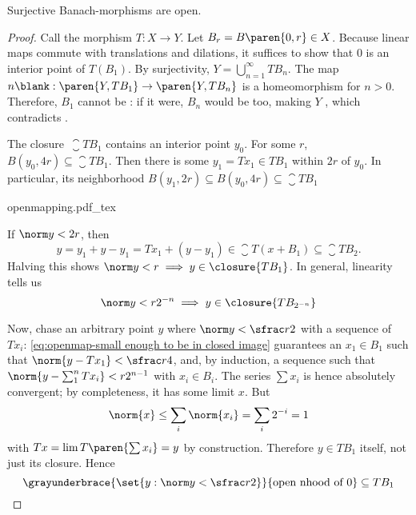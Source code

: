 \documentclass{scrartcl}
\newcommand{\ball}{B}
\begin{document}
\begin{theorem}
  Surjective Banach-morphisms are open.
\end{theorem}
\begin{proof}
  Call the morphism \(T:X\to Y\). Let \(\ball_r=\ball\paren{0,r}\in X\). Because linear maps commute with translations and dilations, it suffices to show that \(0\) is an interior point of \(T(B_1)\). By surjectivity,
  \(Y = \bigcup_{n=1}^\infty TB_n\). The map \(n\blank: \paren{Y,TB_1}\to \paren{Y,TB_n}\) is a homeomorphism for \(n>0\). Therefore, \(B_1\) cannot be : if it were, \(\ball_n\) would be too, making \(Y\) , which contradicts .

  The closure~\(\closure{T\ball_1}\) contains an interior point \(y_0\). For some \(r\), \(\ball(y_0,4r)\subseteq \closure{T\ball_1}\). Then there is some \(y_1=Tx_1\in T\ball_1\) within \(2r\) of \(y_0\). In particular, its neighborhood \(\ball(y_1,2r)\subseteq \ball(y_0,4r)\subseteq \closure{T\ball_1}\)
  \begin{center}
    {openmapping.pdf_tex}
  \end{center}
  If \(\norm y < 2r\), then \[y=y_1+y-y_1 = Tx_1 + (y-y_1)\in \closure{T(x+\ball_1)}\subseteq \closure{T\ball_2}.\] Halving this shows \(\norm y < r \implies y\in \closure{T\ball_1}\). In general, linearity tells us
  \begin{equation}
  \norm y < r2^{-n} \implies y\in \closure{T\ball_{2^{-n}}}\label{eq:openmap-small enough to be in closed image}
\end{equation}

Now, chase an arbitrary point \(y\) where \(\norm y < \sfrac r 2\) with a sequence of \(Tx_i\): \cref{eq:openmap-small enough to be in closed image} guarantees an \(x_1\in \ball_1\) such that \(\norm{y-Tx_1} < \sfrac r 4\), and, by induction, a sequence such that \(\norm{y-\sum_1^n Tx_i} < r2^{n-1}\) with \(x_i\in\ball_i\). The series \(\sum x_i\) is hence absolutely convergent; by completeness, it has some limit \(x\). But
\[
  \norm{x} \leq \sum_i \norm{x_i} = \sum_i 2^{-i} = 1
\]
with \(Tx=\lim T\paren{\sum x_i}=y\) by construction. Therefore \(y\in T\ball_1\) itself, not just its closure. Hence
\[
  \grayunderbrace{\set{y: \norm y < \sfrac r 2}}{\text{open nhood of } 0} \subseteq T\ball_1
\]
\end{proof}
\end{document}
